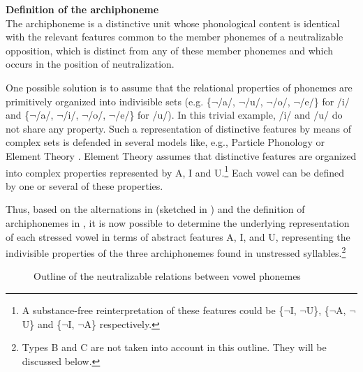 \documentclass[output=paper,
modfonts,
newtxmath,
hidelinks,
]{langscibook}
\begin{document}
\ea \textbf{Definition of the archiphoneme} \citep[201]{Akamatsu1988}\label{18}\\
The archiphoneme is a distinctive unit whose phonological content is identical with the relevant features common to the member phonemes of a neutralizable opposition, which is distinct from any of these member phonemes and which occurs in the position of neutralization.
\z

\noindent One possible solution is to assume that the relational properties of phonemes are primitively organized into indivisible sets (e.g. \{$\neg$/a/, $\neg$/u/, $\neg$/o/, $\neg$/e/\} for /i/ and \{$\neg$/a/, $\neg$/i/, $\neg$/o/, $\neg$/e/\} for /u/). In this trivial example, /i/ and /u/ do not share any property. Such a representation of distinctive features by means of complex sets is defended in several models like, e.g., Particle Phonology \citep{Schane1984} or Element Theory \citep{Kaye-etal1985}. Element Theory assumes that distinctive features are organized into complex properties represented by {\textbar}A{\textbar}, {\textbar}I{\textbar} and {\textbar}U{\textbar}.\footnote{A substance-free reinterpretation of these features could be \{$\neg${\textbar}I{\textbar}, $\neg${\textbar}U{\textbar}\}, \{$\neg${\textbar}A{\textbar}, $\neg${\textbar}U{\textbar}\} and \{$\neg${\textbar}I{\textbar}, $\neg${\textbar}A{\textbar}\} respectively.} Each vowel can be defined by one or several of these properties.

Thus, based on the alternations in  (sketched in ) and the definition of archiphonemes in , it is now possible to determine the underlying representation of each stressed vowel in terms of abstract features {\textbar}A{\textbar}, {\textbar}I{\textbar}, and {\textbar}U{\textbar}, representing the indivisible properties of the three archiphonemes found in unstressed syllables.\footnote{Types B and C are not taken into account in this outline. They will be discussed below.}


\begin{figure}
\caption{Outline of the neutralizable relations between vowel phonemes}
\label{f3}
\end{figure}
\end{document}
